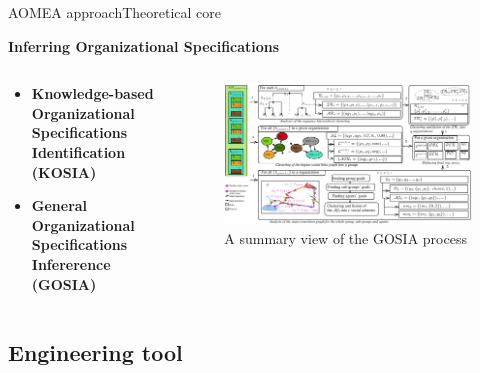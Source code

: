 \begin{frame}{AOMEA approach}{Theoretical core}

    \textbf{Inferring Organizational Specifications}

    \begin{columns}

        \begin{column}{0.3\textwidth}

            \begin{itemize}
                \item \textbf{Knowledge-based Organizational Specifications Identification (KOSIA)}
                \item \textbf{General Organizational Specifications Infererence (GOSIA)}
            \end{itemize}

        \end{column}

        \begin{column}{0.8\textwidth}
            \begin{figure}
                \centering
                \includegraphics[width=0.95\linewidth]{figures/GOSIA_view.png}
                \caption{A summary view of the GOSIA process}
                \label{fig:gosia_process}
            \end{figure}
        \end{column}

    \end{columns}





\end{frame}

\subsection{Engineering tool}

